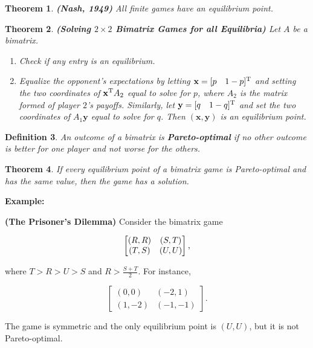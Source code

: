 \documentclass{article}
\theoremstyle{colontheorem}
\newtheorem{theorem}{Theorem}[section]
\newtheorem{definition}[theorem]{Definition}
\newcommand{\T}{^\textnormal{T}}
\newenvironment{Theorem}
{
	\begin{mdframed}[backgroundcolor=TheoremOrange!10]
	\begin{theorem}
}
{
	\end{theorem}
	\end{mdframed}
	
	\vspace{.15in}
}
\newenvironment{Def}
{
	\begin{mdframed}[backgroundcolor=DefGreen!10]
	\begin{definition}
}
{
	\end{definition}
	\end{mdframed}
	
	\vspace{.15in}
}
\newenvironment{Example}
{
	\begin{mdframed}
	\textbf{Example:}%
}
{
	\end{mdframed}
	
	\vspace{.15in}
}
\begin{document}
\begin{Theorem}
	
	\textbf{(Nash, 1949)} All finite games have an equilibrium point.
	
\end{Theorem}



\begin{Theorem}
	
	\textbf{(Solving $2 \times 2$ Bimatrix Games for all Equilibria)} Let $A$ be a bimatrix.
	
	\begin{enumerate}
		
		\item Check if any entry is an equilibrium.
		
		\item Equalize the opponent's expectations by letting $\mathbf{x} = [p\ \ \ 1-p]\T$ and setting the two coordinates of $\mathbf{x}\T A_2$ equal to solve for $p$, where $A_2$ is the matrix formed of player $2$'s payoffs. Similarly, let $\mathbf{y} = [q\ \ \ 1-q]\T$ and set the two coordinates of $A_1 \mathbf{y}$ equal to solve for $q$. Then $(\mathbf{x}, \mathbf{y})$ is an equilibrium point.
		
	\end{enumerate}
	
\end{Theorem}



\begin{Def}
	
	An outcome of a bimatrix is \textbf{Pareto-optimal} if no other outcome is better for one player and not worse for the others.
	
\end{Def}



\begin{Theorem}
	
	If every equilibrium point of a bimatrix game is Pareto-optimal and has the same value, then the game has a solution.
	
\end{Theorem}



\begin{Example}
	\textbf{(The Prisoner's Dilemma)} Consider the bimatrix game
	
	$$
		\begin{bmatrix}
			(R, R) & (S, T)\\
			(T, S) & (U, U)
		\end{bmatrix}\textnormal{,}
	$$
	
	where $T > R > U > S$ and $R > \frac{S+T}{2}$. For instance,
	
	$$
		\begin{bmatrix}
			(0, 0) & (-2, 1)\\
			(1, -2) & (-1, -1)
		\end{bmatrix}.
	$$
	
	The game is symmetric and the only equilibrium point is $(U, U)$, but it is not Pareto-optimal.
	
\end{Example}
\end{document}
